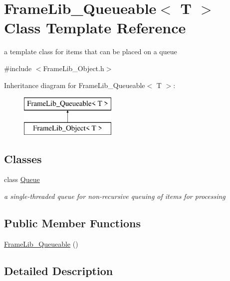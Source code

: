 \hypertarget{class_frame_lib___queueable}{}\section{Frame\+Lib\+\_\+\+Queueable$<$ T $>$ Class Template Reference}
\label{class_frame_lib___queueable}


a template class for items that can be placed on a queue  




{\ttfamily \#include $<$Frame\+Lib\+\_\+\+Object.\+h$>$}

Inheritance diagram for Frame\+Lib\+\_\+\+Queueable$<$ T $>$\+:\begin{figure}[H]
\begin{center}
\leavevmode
\includegraphics[height=2.000000cm]{class_frame_lib___queueable}
\end{center}
\end{figure}
\subsection*{Classes}
\begin{DoxyCompactItemize}
\item 
class \hyperlink{class_frame_lib___queueable_1_1_queue}{Queue}
\begin{DoxyCompactList}\small\item\em a single-\/threaded queue for non-\/recursive queuing of items for processing \end{DoxyCompactList}\end{DoxyCompactItemize}
\subsection*{Public Member Functions}
\begin{DoxyCompactItemize}
\item 
\hyperlink{class_frame_lib___queueable_ae851e341082e42b5d9f35fce31f51870}{Frame\+Lib\+\_\+\+Queueable} ()
\end{DoxyCompactItemize}


\subsection{Detailed Description}
